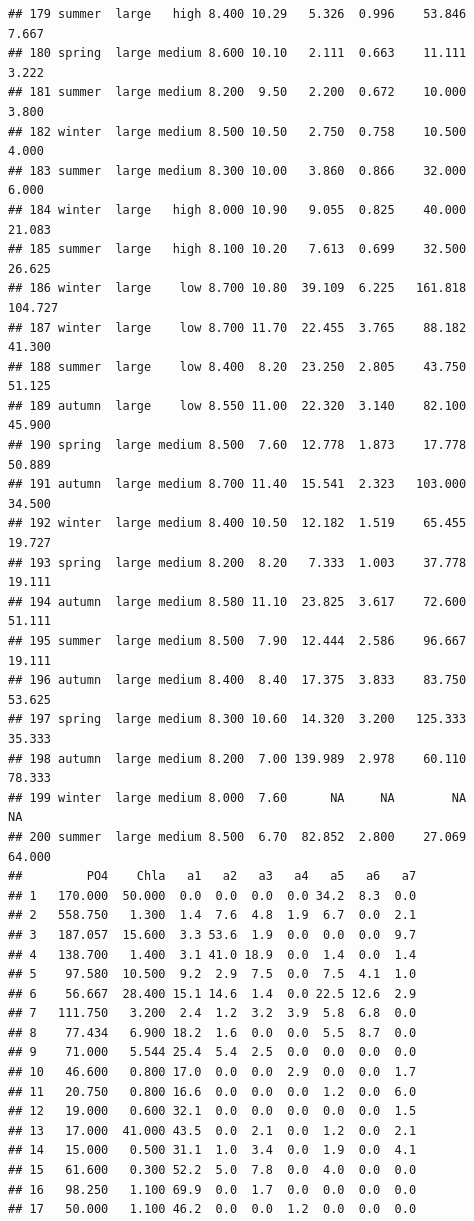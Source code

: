 \documentclass[]{report}
\begin{document}
\begin{verbatim}
## 179 summer  large   high 8.400 10.29   5.326  0.996    53.846   7.667
## 180 spring  large medium 8.600 10.10   2.111  0.663    11.111   3.222
## 181 summer  large medium 8.200  9.50   2.200  0.672    10.000   3.800
## 182 winter  large medium 8.500 10.50   2.750  0.758    10.500   4.000
## 183 summer  large medium 8.300 10.00   3.860  0.866    32.000   6.000
## 184 winter  large   high 8.000 10.90   9.055  0.825    40.000  21.083
## 185 summer  large   high 8.100 10.20   7.613  0.699    32.500  26.625
## 186 winter  large    low 8.700 10.80  39.109  6.225   161.818 104.727
## 187 winter  large    low 8.700 11.70  22.455  3.765    88.182  41.300
## 188 summer  large    low 8.400  8.20  23.250  2.805    43.750  51.125
## 189 autumn  large    low 8.550 11.00  22.320  3.140    82.100  45.900
## 190 spring  large medium 8.500  7.60  12.778  1.873    17.778  50.889
## 191 autumn  large medium 8.700 11.40  15.541  2.323   103.000  34.500
## 192 winter  large medium 8.400 10.50  12.182  1.519    65.455  19.727
## 193 spring  large medium 8.200  8.20   7.333  1.003    37.778  19.111
## 194 autumn  large medium 8.580 11.10  23.825  3.617    72.600  51.111
## 195 summer  large medium 8.500  7.90  12.444  2.586    96.667  19.111
## 196 autumn  large medium 8.400  8.40  17.375  3.833    83.750  53.625
## 197 spring  large medium 8.300 10.60  14.320  3.200   125.333  35.333
## 198 autumn  large medium 8.200  7.00 139.989  2.978    60.110  78.333
## 199 winter  large medium 8.000  7.60      NA     NA        NA      NA
## 200 summer  large medium 8.500  6.70  82.852  2.800    27.069  64.000
##         PO4    Chla   a1   a2   a3   a4   a5   a6   a7
## 1   170.000  50.000  0.0  0.0  0.0  0.0 34.2  8.3  0.0
## 2   558.750   1.300  1.4  7.6  4.8  1.9  6.7  0.0  2.1
## 3   187.057  15.600  3.3 53.6  1.9  0.0  0.0  0.0  9.7
## 4   138.700   1.400  3.1 41.0 18.9  0.0  1.4  0.0  1.4
## 5    97.580  10.500  9.2  2.9  7.5  0.0  7.5  4.1  1.0
## 6    56.667  28.400 15.1 14.6  1.4  0.0 22.5 12.6  2.9
## 7   111.750   3.200  2.4  1.2  3.2  3.9  5.8  6.8  0.0
## 8    77.434   6.900 18.2  1.6  0.0  0.0  5.5  8.7  0.0
## 9    71.000   5.544 25.4  5.4  2.5  0.0  0.0  0.0  0.0
## 10   46.600   0.800 17.0  0.0  0.0  2.9  0.0  0.0  1.7
## 11   20.750   0.800 16.6  0.0  0.0  0.0  1.2  0.0  6.0
## 12   19.000   0.600 32.1  0.0  0.0  0.0  0.0  0.0  1.5
## 13   17.000  41.000 43.5  0.0  2.1  0.0  1.2  0.0  2.1
## 14   15.000   0.500 31.1  1.0  3.4  0.0  1.9  0.0  4.1
## 15   61.600   0.300 52.2  5.0  7.8  0.0  4.0  0.0  0.0
## 16   98.250   1.100 69.9  0.0  1.7  0.0  0.0  0.0  0.0
## 17   50.000   1.100 46.2  0.0  0.0  1.2  0.0  0.0  0.0

\end{verbatim}
\end{document}
